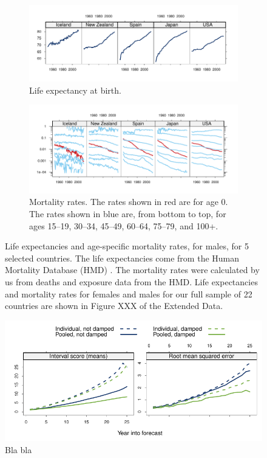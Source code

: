 \documentclass[11pt]{article}\usepackage[]{graphicx}\usepackage[]{color}
\begin{document}
\begin{figure}
\begin{subfigure}{\textwidth}
  \centering
\quad \includegraphics{out/fig_life_exp_sample}
  \caption{Life expectancy at birth.}
\end{subfigure}
\begin{subfigure}{\textwidth}
  \centering
\includegraphics{out/fig_mort_age_sample}
  \caption{Mortality rates.  The rates shown in red are for age 0.  The rates shown in blue are, from bottom to top, for ages 15--19, 30--34, 45--49, 60--64, 75--79, and 100+.}
\end{subfigure}
\caption{Life expectancies and age-specific mortality rates, for males, for 5 selected countries.  The life expectancies come from the Human Mortality Database (HMD) \citep{hmd}. The mortality rates were calculated by us from deaths and exposure data from the HMD.  Life expectancies and mortality rates for females and males for our full sample of 22 countries are shown in Figure XXX of the Extended Data.}
  \label{fig:sample_life_mort}
\end{figure}

\begin{figure}
  \centering
  \includegraphics{out/fig_performance_combined}
  \caption{Bla bla}
  \label{fig:performance_combined}
\end{figure}
\end{document}
